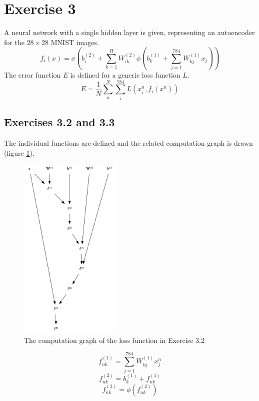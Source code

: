 \documentclass[fleqn]{report}
\begin{document}
\section*{Exercise 3}
A neural network with a single hidden layer is given, representing an autoencoder for the $28 \times 28$ MNIST images.
\begin{equation}
    f_i(x) = \sigma \left (b^{(2)}_i + \sum_{k=1}^H W^{(2)}_{ik} \phi \left ( b^{(1)}_k + \sum_{j=1}^{784} W^{(1)}_{kj} x_j  \right ) \right )
\end{equation}
The error function $E$ is defined for a generic loss function $L$.
\begin{equation}
    E = \frac{1}{N} \sum_n^N \sum_i^{784} L\left(x^n_i, f_i\left(x^n\right)\right)
\end{equation}
\subsection*{Exercises 3.2 and 3.3}
The individual functions are defined and the related computation graph is drawn (figure \ref{fig:cg32}).
\begin{figure}
    \centering
    \includegraphics[height=3.5in]{cg32.png}
    \caption{The computation graph of the loss function in Exercise 3.2}
    \label{fig:cg32}
\end{figure}
\begin{equation}
    f^{(1)}_{nk} = \sum_{j=1}^{784} W^{(1)}_{kj} x^n_j
\end{equation}
\begin{equation}
    f^{(2)}_{nk} = b^{(1)}_k + f^{(1)}_{nk}
\end{equation}
\begin{equation}
    f^{(3)}_{nk} = \phi \left( f^{(2)}_{nk} \right )
\end{equation}
\end{document}
